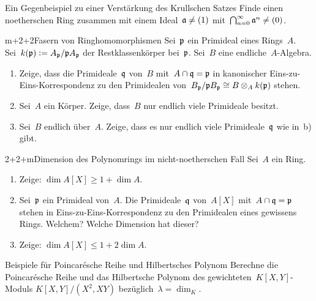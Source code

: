 \documentclass{uebblatt}
\begin{document}

\begin{aufgabe}{2}{Ein Gegenbeispiel zu einer Verstärkung des Krullschen Satzes}
Finde einen noetherschen Ring zusammen mit einem Ideal~$\mathfrak{a} \neq (1)$
mit~$\bigcap_{n=0}^\infty \mathfrak{a}^n \neq (0)$.
\end{aufgabe}

\begin{aufgabe}{m+2+2}{Fasern von Ringhomomorphismen}
Sei~$\mathfrak{p}$ ein Primideal eines Rings~$A$. Sei~$k(\mathfrak{p}) \vcentcolon= A_{\mathfrak{p}}/\mathfrak{p} A_{\mathfrak{p}}$
der Restklassenkörper bei~$\mathfrak{p}$. Sei~$B$ eine endliche~$A$-Algebra.
\begin{enumerate}
\item Zeige, dass die Primideale~$\mathfrak{q}$
von~$B$ mit~$A \cap \mathfrak{q} = \mathfrak{p}$ in kanonischer Eins-zu-Eins-Korrespondenz zu
den Primidealen von~$B_{\mathfrak{p}}/\mathfrak{p} B_{\mathfrak{p}} \cong B \otimes_A k(\mathfrak{p})$ stehen.
\item Sei~$A$ ein Körper. Zeige, dass~$B$ nur endlich
viele Primideale besitzt.
\item Sei~$B$ endlich über~$A$. Zeige, dass es nur endlich viele
Primideale~$\mathfrak{q}$ wie in~b) gibt.
\end{enumerate}
\end{aufgabe}

\begin{aufgabe}{2+2+m}{Dimension des Polynomrings im nicht-noetherschen Fall}
Sei~$A$ ein Ring.
\begin{enumerate}
\item Zeige: $\dim A[X] \geq 1 + \dim A$.
\item Sei~$\mathfrak{p}$ ein Primideal von~$A$. Die Primideale~$\mathfrak{q}$
von~$A[X]$ mit~$A \cap \mathfrak{q} = \mathfrak{p}$ stehen in Eins-zu-Eins-Korrespondenz zu den
Primidealen eines gewissens Rings. Welchem? Welche Dimension hat dieser?
\item Zeige: $\dim A[X] \leq 1 + 2 \dim A$.
\end{enumerate}
\end{aufgabe}

\begin{aufgabe}{3}{Beispiele für Poincarésche Reihe und Hilbertsches Polynom}
Berechne die Poincarésche Reihe und das Hilbertsche Polynom des
gewichteten~$K[X,Y]$-Moduls $K[X,Y]/(X^2, XY)$ bezüglich~$\lambda = \dim_K$.
\end{aufgabe}
\end{document}
